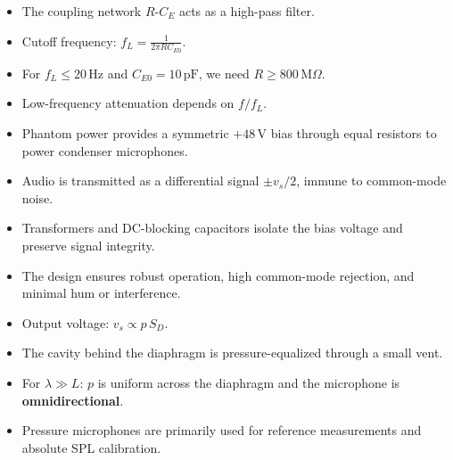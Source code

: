 \begin{tcolorbox}[colback=gray!10!white,colframe=black,title=\textbf{Summary – High-pass Behavior}]
\begin{itemize}
    \item The coupling network \( R \)-\( C_E \) acts as a high-pass filter.
    \item Cutoff frequency: \( f_L = \frac{1}{2\pi R C_{E0}} \).
    \item For \( f_L \leq 20\,\text{Hz} \) and \( C_{E0} = 10\,\text{pF} \), we need \( R \geq 800\,\text{M}\Omega \).
    \item Low-frequency attenuation depends on \( f/f_L \).
\end{itemize}
\end{tcolorbox}

\begin{tcolorbox}[colback=gray!10!white,colframe=black,title=\textbf{Summary – Phantom Power Supply}]
\begin{itemize}
    \item Phantom power provides a symmetric \( +48\,\text{V} \) bias through equal resistors to power condenser microphones.
    \item Audio is transmitted as a differential signal \( \pm v_s/2 \), immune to common-mode noise.
    \item Transformers and DC-blocking capacitors isolate the bias voltage and preserve signal integrity.
    \item The design ensures robust operation, high common-mode rejection, and minimal hum or interference.
\end{itemize}
\end{tcolorbox}


\begin{tcolorbox}[colback=gray!10!white,colframe=black,title=\textbf{Summary – Pressure Microphones}]
\begin{itemize}
    \item Output voltage: \( v_s \propto p \, S_D \).
    \item The cavity behind the diaphragm is pressure-equalized through a small vent.
    \item For \( \lambda \gg L \): \( p \) is uniform across the diaphragm and the microphone is \textbf{omnidirectional}.
    \item Pressure microphones are primarily used for reference measurements and absolute SPL calibration.
\end{itemize}
\end{tcolorbox}




